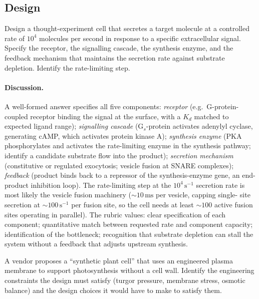 \subsection*{Design}

\begin{exercise}
Design a thought-experiment cell that secretes a target molecule at a
controlled rate of $10^4$ molecules per second in response to a
specific extracellular signal. Specify the receptor, the signalling
cascade, the synthesis enzyme, and the feedback mechanism that
maintains the secretion rate against substrate depletion. Identify
the rate-limiting step.
\end{exercise}

\paragraph{Discussion.}
A well-formed answer specifies all five components: \emph{receptor}
(e.g.\ G-protein-coupled receptor binding the signal at the surface,
with a $K_d$ matched to expected ligand range); \emph{signalling
cascade} (G$_s$-protein activates adenylyl cyclase, generating cAMP,
which activates protein kinase A); \emph{synthesis enzyme} (PKA
phosphorylates and activates the rate-limiting enzyme in the
synthesis pathway; identify a candidate substrate flow into the
product); \emph{secretion mechanism} (constitutive or regulated
exocytosis; vesicle fusion at SNARE complexes); \emph{feedback}
(product binds back to a repressor of the synthesis-enzyme gene, an
end-product inhibition loop). The rate-limiting step at the
$10^4\,\text{s}^{-1}$ secretion rate is most likely the vesicle
fusion machinery ($\sim 10\,\text{ms}$ per vesicle, capping single-
site secretion at $\sim 100\,\text{s}^{-1}$ per fusion site, so the
cell needs at least $\sim 100$ active fusion sites operating in
parallel). The rubric values: clear specification of each component;
quantitative match between requested rate and component capacity;
identification of the bottleneck; recognition that substrate
depletion can stall the system without a feedback that adjusts
upstream synthesis.

\begin{exercise}
A vendor proposes a ``synthetic plant cell'' that uses an engineered
plasma membrane to support photosynthesis without a cell wall. Identify
the engineering constraints the design must satisfy (turgor pressure,
membrane stress, osmotic balance) and the design choices it would have
to make to satisfy them.
\end{exercise}

